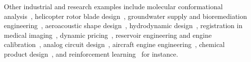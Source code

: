 
Other industrial and research examples include molecular conformational analysis~\cite{Alberto_Etal_2004,Meza_Martinez_1994}, helicopter rotor blade design~\cite{Booker_Etal_1998a,Booker_Etal_1998b,Serafini_1998}, groundwater supply and bioremediation engineering~\cite{Fowler_Etal_2008,Mugunthan_Shoemaker_Regis_2005,Yoon_Shoemaker_1999}, aeroacoustic shape design~\cite{Marsden_2004,Marsden_Etal_2004}, hydrodynamic design~\cite{Duvigneau_Visonneau_2004}, registration in medical imaging~\cite{Oeuvray_2005,Oeuvray_Bierlaire_2007}, dynamic pricing~\cite{Levina_Etal_2009}, reservoir engineering and engine calibration~\cite{Langouet_2011}, analog circuit design~\cite{Latorre_Etal_2019}, aircraft engine engineering~\cite{Gazaix_Etal_2019}, chemical product design~\cite{Sun_Etal_2020}, and reinforcement learning~\cite{Qian_Yu_2021} for instance.

